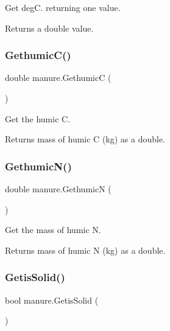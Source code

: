 Get degC. returning one value. 

\begin{DoxyReturn}{Returns}
a double value. 
\end{DoxyReturn}
\mbox{\label{classmanure_a8faaa73025550e7623695f40ee9033ea}} 
\subsubsection{\texorpdfstring{GethumicC()}{GethumicC()}}
{\footnotesize\ttfamily double manure.\+GethumicC (\begin{DoxyParamCaption}{ }\end{DoxyParamCaption})\hspace{0.3cm}{\ttfamily [inline]}}



Get the humic C. 

\begin{DoxyReturn}{Returns}
mass of humic C (kg) as a double. 
\end{DoxyReturn}
\mbox{\label{classmanure_a74c747509def8fb631dd3e37eb20aefb}} 
\subsubsection{\texorpdfstring{GethumicN()}{GethumicN()}}
{\footnotesize\ttfamily double manure.\+GethumicN (\begin{DoxyParamCaption}{ }\end{DoxyParamCaption})\hspace{0.3cm}{\ttfamily [inline]}}



Get the mass of humic N. 

\begin{DoxyReturn}{Returns}
mass of humic N (kg) as a double. 
\end{DoxyReturn}
\mbox{\label{classmanure_a374d7b59e1477492b3ce60b11b86c7f3}} 
\subsubsection{\texorpdfstring{GetisSolid()}{GetisSolid()}}
{\footnotesize\ttfamily bool manure.\+Getis\+Solid (\begin{DoxyParamCaption}{ }\end{DoxyParamCaption})\hspace{0.3cm}{\ttfamily [inline]}}



